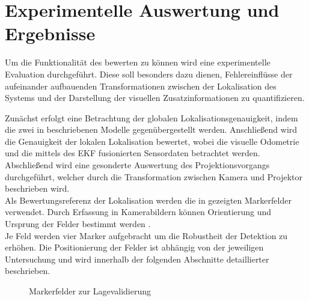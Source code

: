 \chapter{Experimentelle Auswertung und Ergebnisse}
\label{chap.results}


Um die Funktionalität des  bewerten  zu können wird eine experimentelle Evaluation durchgeführt. Diese soll besonders dazu dienen, Fehlereinflüsse der aufeinander aufbauenden Transformationen zwischen der Lokalisation des Systems und der Darstellung der visuellen Zusatzinformationen zu quantifizieren.\\


Zunächst erfolgt eine Betrachtung der globalen Lokalisationsgenauigkeit, indem die zwei in  beschriebenen Modelle gegenübergestellt werden. Anschließend wird die Genauigkeit der lokalen Lokalisation bewertet, wobei die visuelle Odometrie und die mittels des EKF fusionierten Sensordaten betrachtet werden. Abschließend wird eine gesonderte Auswertung des Projektionsvorgangs durchgeführt, welcher durch die Transformation zwischen Kamera und Projektor beschrieben wird.\\

Als Bewertungsreferenz der Lokalisation werden die in  gezeigten Markerfelder verwendet. Durch Erfassung in Kamerabildern können Orientierung und Ursprung der Felder bestimmt werden \cite{arsys}.\\
Je Feld werden vier Marker aufgebracht um die Robustheit der Detektion zu erhöhen. Die Positionierung der Felder ist abhängig von der jeweiligen Untersuchung und wird innerhalb der folgenden Abschnitte detaillierter beschrieben.\\

\begin{figure}[!ht]
	\begin{center}
	
	\hspace{5mm}
	\caption{Markerfelder zur Lagevalidierung}
	\label{fig.armarker}
	\end{center}
\end{figure}


